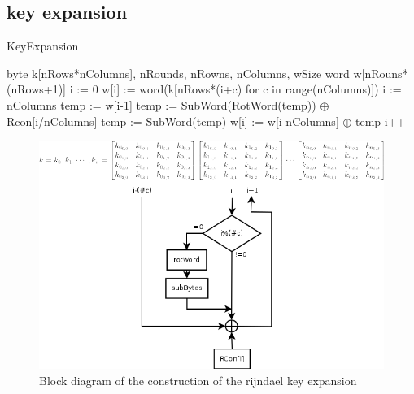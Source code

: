 \documentclass[a4paper,twoside]{llncs}
\begin{document}
\subsection{key expansion}

\begin{algorithm}
 \caption{KeyExpansion}
 \label{alg:keyExpansion}
 \begin{algorithmic}[1]
  \REQUIRE byte k[nRows*nColumns], nRounds, nRowns, nColumns, wSize
  \ENSURE word w[nRouns*(nRows+1)]
  \STATE i := 0
    \STATE w[i] := word(k[nRows*(i+c) for c in range(nColumns)])
  \ENDWHILE
  \STATE i := nColumns
    \STATE temp := w[i-1]
      \STATE temp := SubWord(RotWord(temp)) $\oplus$ Rcon[i/nColumns]
    \ELSE
      \STATE temp := SubWord(temp)
    \ENDIF
    \STATE w[i] := w[i-nColumns] $\oplus$ temp
    \STATE i++
  \ENDWHILE
 \end{algorithmic}
\end{algorithm}

\begin{figure}[b]
 \centering
 \includegraphics[scale=0.4,keepaspectratio=true]{./images/rijndael_keyExpansionDiagram.png}
 \caption{Block diagram of the construction of the rijndael key expansion}
\label{fig:keyExpansionDiagram}
\end{figure}
\end{document}
